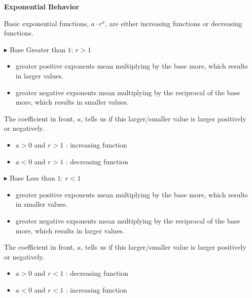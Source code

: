 \documentclass{ximera}
\begin{document}
\begin{observation} \textbf{\textcolor{blue!75!black}{Exponential Behavior}}


Basic exponential functions, $a \cdot r^x$, are either increasing functions or decreasing functions.


$\blacktriangleright$  Base Greater than $1$: $r > 1$


\begin{itemize}
\item greater positive exponents mean multiplying by the base more, which results in larger values.  
\item greater negative exponents mean multiplying by the reciprocal of the base more, which results in smaller values.  
\end{itemize}


The coefficient in front, $a$, tells us if this larger/smaller value is larger positively or negatively.


\begin{itemize}
\item $a > 0$ and $r > 1$ : increasing function
\item $a < 0$ and $r > 1$ : decreasing function  
\end{itemize}






$\blacktriangleright$  Base Less than $1$: $r < 1$


\begin{itemize} 
\item greater positive exponents mean multiplying by the base more, which results in smaller values.  
\item greater negative exponents mean multiplying by the reciprocal of the base more, which results in larger values.  
\end{itemize}


The coefficient in front, $a$, tells us if this larger/smaller value is larger positively or negatively.


\begin{itemize}
\item $a > 0$ and $r < 1$ : decreasing function
\item $a < 0$ and $r < 1$ : increasing function  
\end{itemize}



\end{observation}
\end{document}
